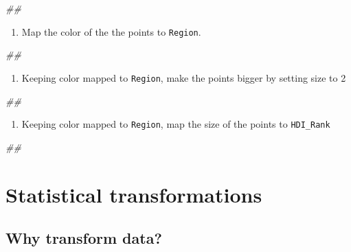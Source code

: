 \documentclass[
]{book}
\newenvironment{Shaded}{\begin{snugshade}}{\end{snugshade}}
\newcommand{\CommentTok}[1]{\textcolor[rgb]{0.56,0.35,0.01}{\textit{#1}}}
\providecommand{\tightlist}{%
  \setlength{\itemsep}{0pt}\setlength{\parskip}{0pt}}
\begin{document}
\begin{Shaded}
\begin{Highlighting}[]
\CommentTok{## }
\end{Highlighting}
\end{Shaded}

\begin{enumerate}
\def\labelenumi{\arabic{enumi}.}
\setcounter{enumi}{2}
\tightlist
\item
  Map the color of the the points to \texttt{Region}.
\end{enumerate}

\begin{Shaded}
\begin{Highlighting}[]
\CommentTok{## }
\end{Highlighting}
\end{Shaded}

\begin{enumerate}
\def\labelenumi{\arabic{enumi}.}
\setcounter{enumi}{3}
\tightlist
\item
  Keeping color mapped to \texttt{Region}, make the points bigger by setting size to 2
\end{enumerate}

\begin{Shaded}
\begin{Highlighting}[]
\CommentTok{## }
\end{Highlighting}
\end{Shaded}

\begin{enumerate}
\def\labelenumi{\arabic{enumi}.}
\setcounter{enumi}{4}
\tightlist
\item
  Keeping color mapped to \texttt{Region}, map the size of the points to \texttt{HDI\_Rank}
\end{enumerate}

\begin{Shaded}
\begin{Highlighting}[]
\CommentTok{## }
\end{Highlighting}
\end{Shaded}

\hypertarget{statistical-transformations}{%
\section{Statistical transformations}\label{statistical-transformations}}

\hypertarget{why-transform-data}{%
\subsection{Why transform data?}\label{why-transform-data}}
\end{document}
